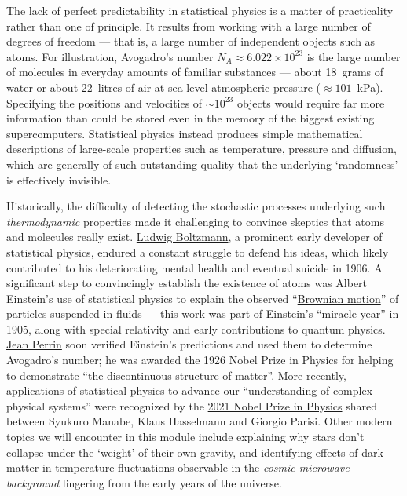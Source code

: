 The lack of perfect predictability in statistical physics is a matter of practicality rather than one of principle.
It results from working with a large number of degrees of freedom --- that is, a large number of independent objects such as atoms.
For illustration, Avogadro's number $N_A \approx 6.022\times 10^{23}$ is the large number of molecules in everyday amounts of familiar substances --- about 18~grams of water or about 22~litres of air at sea-level atmospheric pressure ($\approx$$101$~kPa). %
Specifying the positions and velocities of $\sim$$10^{23}$ objects would require far more information than could be stored even in the memory of the biggest existing supercomputers.
Statistical physics instead produces simple mathematical descriptions of large-scale properties such as temperature, pressure and diffusion, which are generally of such outstanding quality that the underlying `randomness' is effectively invisible.

Historically, the difficulty of detecting the stochastic processes underlying such \textit{thermodynamic} properties made it challenging to convince skeptics that atoms and molecules really exist.
\href{https://en.wikipedia.org/wiki/Ludwig_Boltzmann}{Ludwig Boltzmann}, a prominent early developer of statistical physics, endured a constant struggle to defend his ideas, which likely contributed to his deteriorating mental health and eventual suicide in 1906.
A significant step to convincingly establish the existence of atoms was Albert Einstein's use of statistical physics to explain the observed ``\href{https://en.wikipedia.org/wiki/Brownian_motion}{Brownian motion}'' of particles suspended in fluids --- this work was part of Einstein's ``miracle year'' in 1905, along with special relativity and early contributions to quantum physics.
\href{https://en.wikipedia.org/wiki/Jean_Baptiste_Perrin}{Jean Perrin} soon verified Einstein's predictions and used them to determine Avogadro's number; he was awarded the 1926 Nobel Prize in Physics for helping to demonstrate ``the discontinuous structure of matter''.
More recently, applications of statistical physics to advance our ``understanding of complex physical systems'' were recognized by the \href{https://www.nobelprize.org/prizes/physics/2021/summary/}{2021 Nobel Prize in Physics} shared between Syukuro Manabe, Klaus Hasselmann and Giorgio Parisi.
Other modern topics we will encounter in this module include explaining why stars don't collapse under the `weight' of their own gravity, and identifying effects of dark matter in temperature fluctuations observable in the \textit{cosmic microwave background} lingering from the early years of the universe.

